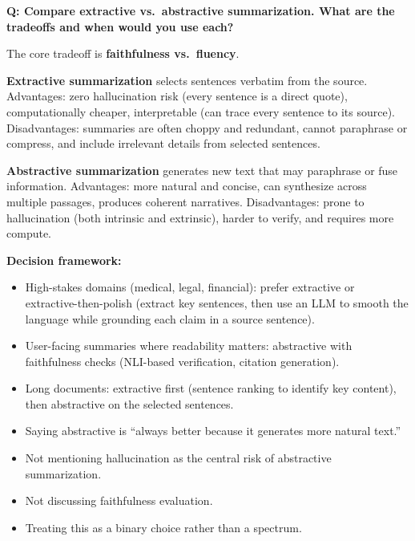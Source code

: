 \begin{interviewq}
\textbf{Q: Compare extractive vs.\ abstractive summarization. What are the tradeoffs and when
would you use each?}

 \quad {} \quad \badgefreq{\freqhigh}

\stronganswer
The core tradeoff is \textbf{faithfulness vs.\ fluency}.

\textbf{Extractive summarization} selects sentences verbatim from the source.  Advantages:
zero hallucination risk (every sentence is a direct quote), computationally cheaper,
interpretable (can trace every sentence to its source).  Disadvantages: summaries are often
choppy and redundant, cannot paraphrase or compress, and include irrelevant details from
selected sentences.

\textbf{Abstractive summarization} generates new text that may paraphrase or fuse information.
Advantages: more natural and concise, can synthesize across multiple passages, produces
coherent narratives.  Disadvantages: prone to hallucination (both intrinsic and extrinsic),
harder to verify, and requires more compute.

\textbf{Decision framework:}
\begin{itemize}
    \item High-stakes domains (medical, legal, financial): prefer extractive or
    extractive-then-polish (extract key sentences, then use an LLM to smooth the language
    while grounding each claim in a source sentence).
    \item User-facing summaries where readability matters: abstractive with faithfulness
    checks (NLI-based verification, citation generation).
    \item Long documents: extractive first (sentence ranking to identify key content), then
    abstractive on the selected sentences.
\end{itemize}

\redflags
\begin{itemize}
    \item Saying abstractive is ``always better because it generates more natural text.''
    \item Not mentioning hallucination as the central risk of abstractive summarization.
    \item Not discussing faithfulness evaluation.
    \item Treating this as a binary choice rather than a spectrum.
\end{itemize}


\end{interviewq}
